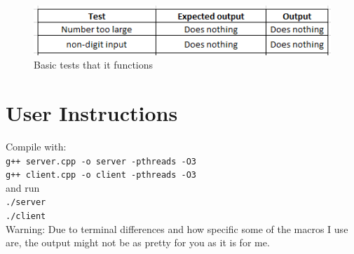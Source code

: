 \documentclass{article}
\begin{document}
    \begin{figure}[ht!]
        \centering
        \includegraphics{figures/extensiveTests.png}
        \caption{Basic tests that it functions}
        \label{fig:extensiveTesting}
    \end{figure}


    \section{User Instructions}
    Compile with: \\
    \texttt{g++ server.cpp -o server -pthreads -O3} \\
    \texttt{g++ client.cpp -o client -pthreads -O3} \\
    and run \\
    \texttt{./server} \\
    \texttt{./client} \\
    Warning: Due to terminal differences and how specific some of the macros I use are,
    the output might not be as pretty for you as it is for me.
\end{document}
